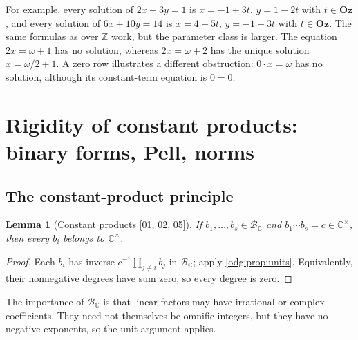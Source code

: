 \documentclass[11pt,oneside]{article}
\numberwithin{equation}{section}
\newtheorem{lemma}[lemma]{Lemma}
\theoremstyle{definition}
\theoremstyle{remark}
\newcommand{\Oz}{\mathbf{Oz}}
\newcommand{\Z}{\mathbb Z}
\newcommand{\C}{\mathbb C}
\newcommand{\BC}{\mathcal B_{\C}}
\newcommand{\src}[1]{\textup{\textsf{\small[#1]}}}
\begin{document}
For example, every solution of $2x+3y=1$ is $x=-1+3t$, $y=1-2t$ with
$t\in\Oz$, and every solution of $6x+10y=14$ is $x=4+5t$, $y=-1-3t$ with
$t\in\Oz$. The same formulas as over $\Z$ work, but the parameter class is
larger. The equation $2x=\omega+1$ has no solution, whereas $2x=\omega+2$ has
the unique solution $x=\omega/2+1$. A zero row illustrates a different
obstruction: $0\cdot x=\omega$ has no solution, although its constant-term
equation is $0=0$.

\section{Rigidity of constant products: binary forms, Pell, norms}\label{odg:sec:rigidity}

\subsection{The constant-product principle}

\begin{lemma}[Constant products \src{01, 02, 05}]\label{odg:lem:constantproduct}
If $b_1,\ldots,b_s\in\BC$ and $b_1\cdots b_s=c\in\C^\times$, then every
$b_i$ belongs to $\C^\times$.
\end{lemma}
\begin{proof}
Each $b_i$ has inverse $c^{-1}\prod_{j\ne i}b_j$ in $\BC$; apply
\cref{odg:prop:units}. Equivalently, their nonnegative degrees have sum
zero, so every degree is zero.
\end{proof}

The importance of $\BC$ is that linear factors may have irrational or
complex coefficients. They need not themselves be omnific integers, but they
have no negative exponents, so the unit argument applies.
\end{document}
